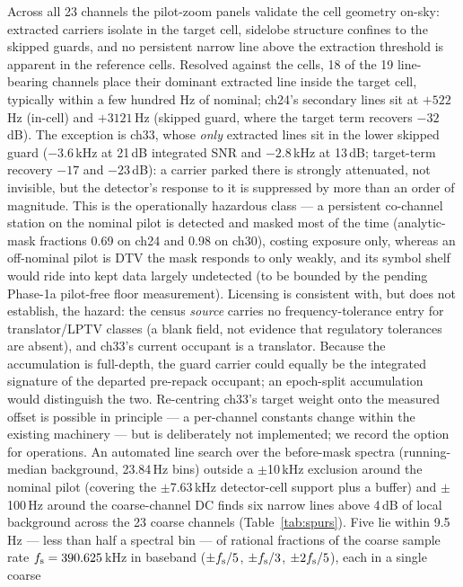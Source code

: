Across all 23 channels the pilot-zoom panels validate the cell
geometry on-sky: extracted carriers isolate in the target cell,
sidelobe structure confines to the skipped guards, and no persistent
narrow line above the extraction threshold is apparent in the
reference cells. Resolved against the cells, 18 of the 19 line-bearing
channels place their dominant extracted line inside the target cell,
typically within a few hundred Hz of nominal; ch24's secondary lines
sit at $+522$\,Hz (in-cell) and $+3121$\,Hz (skipped guard, where the
target term recovers $-32$\,dB). The exception is ch33, whose
\emph{only} extracted lines sit in the lower skipped guard ($-3.6$\,kHz
at 21\,dB integrated SNR and $-2.8$\,kHz at 13\,dB; target-term
recovery $-17$ and $-23$\,dB): a carrier parked there is strongly
attenuated, not invisible, but the detector's response to it is
suppressed by more than an order of magnitude. This is the
operationally hazardous class
--- a persistent co-channel station on the nominal pilot is detected
and masked most of the time (analytic-mask fractions 0.69 on ch24 and
0.98 on ch30), costing exposure only, whereas
an off-nominal pilot is DTV the mask responds to only weakly, and its
symbol shelf would ride into kept data largely undetected (to be
bounded by the pending Phase-1a pilot-free floor measurement).
Licensing is consistent with, but does not establish, the hazard: the
census \emph{source} carries no frequency-tolerance entry for
translator/LPTV classes (a blank field, not evidence that regulatory
tolerances are absent), and ch33's current occupant is a translator. Because the
accumulation is full-depth, the guard carrier could equally be the
integrated signature of the departed pre-repack occupant; an
epoch-split accumulation would distinguish the two. Re-centring ch33's
target weight onto the measured offset is possible in principle --- a
per-channel constants change within the existing machinery --- but is
deliberately not implemented; we record the option for operations.
An automated line search over the before-mask spectra (running-median
background, 23.84\,Hz bins) outside a $\pm$10\,kHz exclusion around the
nominal pilot (covering the $\pm$7.63\,kHz detector-cell support plus a
buffer) and $\pm$100\,Hz around the coarse-channel DC finds six narrow
lines above 4\,dB of local background across the 23 coarse channels
(Table~\ref{tab:spurs}). Five lie within 9.5\,Hz --- less than half a
spectral bin --- of rational fractions of the coarse sample rate
$f_{\rm s}=390.625$\,kHz in baseband ($\pm f_{\rm s}/5$,
$\pm f_{\rm s}/3$, $\pm 2f_{\rm s}/5$), each in a single coarse

